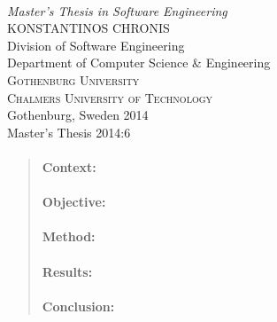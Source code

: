 \begin{titlepage}

\mbox{}
\vfill
\addtolength{\voffset}{2cm}
\begin{flushleft}
	{ \\[0.5cm]
	\emph{\Large Master's Thesis in Software Engineering} \\[.8cm]
	
	{\huge KONSTANTINOS CHRONIS}\\[.8cm]
	
	{\Large Division of Software Engineering \\
	Department of Computer Science \& Engineering \\
	\textsc{Gothenburg University} \\
	\textsc{Chalmers University of Technology} \\
	Gothenburg, Sweden 2014 \\
	Master's Thesis 2014:6\\
	} 
	}
\end{flushleft}

\end{titlepage}
\ClearShipoutPicture

\pagestyle{empty}
\newpage
\clearpage
\mbox{}
\newpage
\clearpage
\thispagestyle{empty}

\begin{abstract}
\paragraph{Context:} 

\paragraph{Objective:} 
 
\paragraph{Method:} 

\paragraph{Results:} 

\paragraph{Conclusion:} 
\end{abstract}


